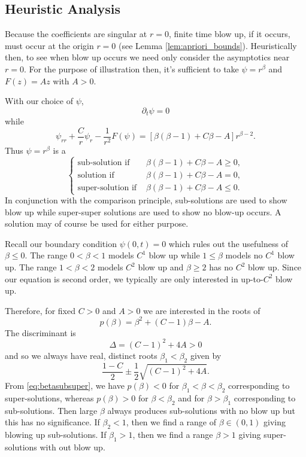 \documentclass{amsart}
\begin{document}
\subsection*{Heuristic Analysis}

Because the coefficients are singular at \(r=0\), finite time blow up, if it occurs, must occur at the origin \(r = 0\) (see Lemma \ref{lem:apriori_bounds}). Heuristically then, to see when blow up occurs we need only consider the asymptotics near \(r = 0\). For the purpose of illustration then, it's sufficient to take \(\psi = r^{\beta}\) and \(F(z) = A z\) with \(A > 0\).

With our choice of \(\psi\),
\[
\partial_t \psi = 0
\]
while
\[
\psi_{rr} + \frac{C}{r} \psi_r - \frac{1}{r^2} F(\psi) = \left[\beta(\beta-1) + C \beta - A\right]r^{\beta-2}.
\]
Thus \(\psi = r^{\beta}\) is a
\begin{equation}
\label{eq:betasubsuper}
\begin{cases}
\text{sub-solution if } & \beta(\beta-1) + C \beta - A \geq 0, \\
\text{solution if } & \beta(\beta-1) + C \beta - A = 0, \\
\text{super-solution if } & \beta(\beta-1) + C \beta - A \leq 0.
\end{cases}
\end{equation}
In conjunction with the comparison principle, sub-solutions are used to show blow up while super-super solutions are used to show no blow-up occurs. A solution may of course be used for either purpose.

Recall our boundary condition \(\psi(0, t) = 0\) which rules out the usefulness of \(\beta \leq 0\). The range \(0 < \beta < 1\) models \(C^1\) blow up while \(1 \leq \beta\) models no \(C^1\) blow up. The range \(1 < \beta < 2\) models \(C^2\) blow up and \(\beta \geq 2\) has no \(C^2\) blow up. Since our equation is second order, we typically are only interested in up-to-\(C^2\) blow up.

Therefore, for fixed \(C > 0\) and \(A > 0\) we are interested in the roots of
\[
p(\beta) = \beta^2 + (C - 1) \beta - A.
\]
The discriminant is
\[
\Delta = (C-1)^2 + 4 A > 0
\]
and so we always have real, distinct roots \(\beta_1 < \beta_2\) given by
\[
\frac{1 - C}{2} \pm \frac{1}{2} \sqrt{(C-1)^2 + 4 A}.
\]
From \eqref{eq:betasubsuper}, we have \(p(\beta) < 0\) for \(\beta_1 < \beta < \beta_2\) corresponding to super-solutions, whereas \(p(\beta) > 0\) for \(\beta < \beta_2\) and for \(\beta > \beta_1\) corresponding to sub-solutions. Then large \(\beta\) always produces sub-solutions with no blow up but this has no significance. If \(\beta_2 < 1\), then we find a range of \(\beta \in (0, 1)\) giving blowing up sub-solutions. If \(\beta_1 > 1\), then we find a range \(\beta > 1\) giving super-solutions with out blow up.
\end{document}
